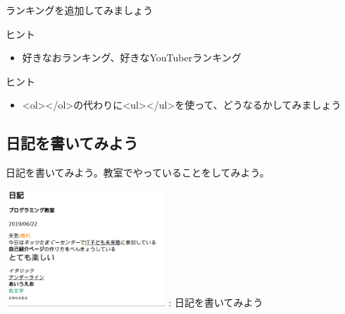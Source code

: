 \documentclass[a4paper,12pt]{jarticle}
\begin{document}
\bigskip


\bigskip


\bigskip


\theQuestion\label{Q:hasAnswer04-6}

ランキングを追加してみましょう

ヒント

\begin{itemize}
  \item
        好きなおランキング、好きなYouTuberランキング
\end{itemize}


\bigskip

\bigskip

\theQuestion\label{Q:hasAnswer04-7}

ヒント

\begin{itemize}
  \item
        {\textless}ol{\textgreater}{\textless}/ol{\textgreater}の代わりに{\textless}ul{\textgreater}{\textless}/ul{\textgreater}を使って、どうなるかしてみましょう
\end{itemize}



\bigskip

\clearpage
{}
\subsection{\theExercise 日記を書いてみよう}
日記を書いてみよう。教室でやっていることをしてみよう。

\centering
\begin{minipage}{6.32cm}
  {\upshape
    \includegraphics[width=0.45\textwidth]{textbook-img185.png}
    \newline
    : 日記を書いてみよう}
\end{minipage}

\bigskip
\end{document}
